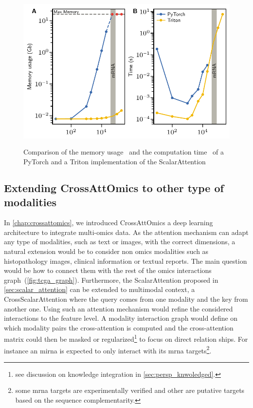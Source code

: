 \documentclass[../main.tex]{subfiles}
\begin{document}
		\begin{figure}[htbp]
			\centering
			\begin{subcaptiongroup}
				\includegraphics{ScalarAttentionBenchmark.pdf}
				\label{fig:lin_attention_benchA}
				\label{fig:lin_attention_benchB}
			\end{subcaptiongroup}
			\caption[Comparison of two ScalarAttention implementation]{Comparison of the memory usage~ and the computation time~ of a \textcolor[HTML]{3969AC}{PyTorch} and a \textcolor[HTML]{F2B701}{Triton} implementation of the ScalarAttention}
			\label{fig:lin_attention_bench}
		\end{figure}

	\subsection{Extending CrossAttOmics to other type of modalities}
		In \cref{chap:crossattomics}, we introduced CrossAttOmics a deep learning architecture to integrate multi-omics data.
		As the attention mechanism can adapt any type of modalities, such as text or images, with the correct dimensions, a natural extension would be to consider non omics modalities such as histopathology images, clinical information or textual reports.
		The main question would be how to connect them with the rest of the omics interactions graph~(\cref{fig:tcga_graph}).
		Furthermore, the ScalarAttention proposed in \cref{sec:scalar_attention} can be extended to multimodal context, \ie{}a CrossScalarAttention where the query comes from one modality and the key from another one.
		Using such an attention mechanism would refine the considered interactions to the feature level.
		A modality interaction graph would define on which modality pairs the cross-attention is computed and the cross-attention matrix could then be masked or regularized\footnote{see discussion on knowledge integration in \cref{sec:persp_knwoledged}.} to focus on direct relation ships.
		For instance an \gls{mirna} is expected to only interact with its \gls{mrna} targets\footnote{some \gls{mrna} targets are experimentally verified and other are putative targets based on the sequence complementarity.}.
\end{document}
